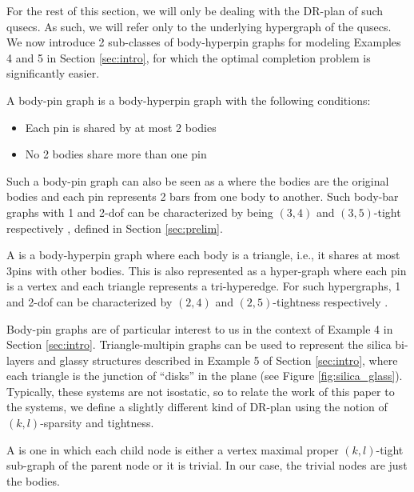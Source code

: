 For the rest of this section, we will only be dealing with the DR-plan of
such qusecs. As such, we will refer only to the underlying hypergraph of the qusecs. We now
introduce 2 sub-classes of body-hyperpin graphs for modeling Examples 4 and
5 in Section \ref{sec:intro}, for which the optimal completion problem is
significantly easier.

\begin{definition}
\label{def:body-pin}
    A body-pin graph is a body-hyperpin graph with the following conditions:
    \begin{itemize}
        \item Each pin is shared by at most 2 bodies
        \item No 2 bodies share more than one pin
    \end{itemize}
    Such a body-pin graph can also be seen as a  where
    the bodies are the original bodies and each pin represents 2 bars from
    one body to another. Such body-bar graphs with 1 and 2-dof can be
    characterized by being $(3,4)$ and $(3,5)$-tight respectively
    \cite{Lee:2007:PGA} \cite{streinu2009sparse},
defined in Section  \ref{sec:prelim}.
\end{definition}

\begin{definition}
    A  is a body-hyperpin graph where each body
    is a triangle, i.e., it shares at most 3pins with other bodies. This is also represented as a hyper-graph where each pin is a vertex and each triangle represents a tri-hyperedge. For such hypergraphs, 1 and 2-dof can be characterized by $(2,4)$ and $(2,5)$-tightness respectively \cite{Lee:2007:PGA} \cite{streinu2009sparse}.
\end{definition}

Body-pin graphs are of particular interest to us in the context of Example 4
in Section \ref{sec:intro}. Triangle-multipin graphs can be used to
represent the silica bi-layers and glassy structures described in Example 5
of Section \ref{sec:intro}, where each triangle is the junction of ``disks''
in the plane (see Figure \ref{fig:silica_glass}). Typically, these systems
are not isostatic, so to relate the work of this paper to the systems, we
define a slightly different kind of DR-plan using the notion of
$(k,l)$-sparsity and tightness.

\begin{definition}
    A  is one in which each child node is either a vertex maximal proper $(k,l)$-tight sub-graph of the parent node or it is trivial. In our case, the trivial nodes are just the bodies.
\end{definition}

